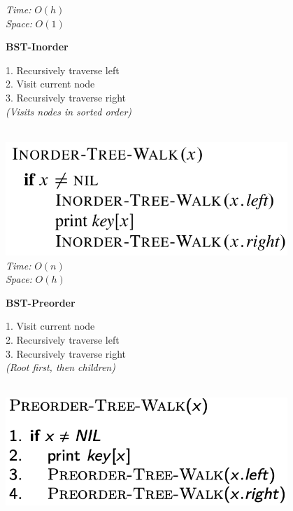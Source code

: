 {\begin{minipage}[t]{1\textwidth}
\begin{minipage}[t]{0.19\textwidth}
        \textit{Time:} \(O(h)\)\\
        \textit{Space:} \(O(1)\)
    \end{minipage}
    \hfill
    \begin{minipage}[t]{0.19\textwidth}
        \centering
        \textbf{\scriptsize BST-Inorder}\\[2pt]
        \scriptsize
        \begin{minipage}[t]{\textwidth}
            \scriptsize
            1. Recursively traverse left\\
            2. Visit current node\\
            3. Recursively traverse right\\
            \textit{(Visits nodes in sorted order)}
        \end{minipage}\\[4pt]
        \includegraphics[width=0.8\textwidth]{images/bst-inorder.png}\\[2pt]
        \textit{Time:} \(O(n)\)\\
        \textit{Space:} \(O(h)\)
    \end{minipage}
    \hfill
    \begin{minipage}[t]{0.19\textwidth}
        \centering
        \textbf{\scriptsize BST-Preorder}\\[2pt]
        \scriptsize
        \begin{minipage}[t]{\textwidth}
            \scriptsize
            1. Visit current node\\
            2. Recursively traverse left\\
            3. Recursively traverse right\\
            \textit{(Root first, then children)}
        \end{minipage}\\[4pt]
        \includegraphics[width=0.8\textwidth]{images/bst-preorder.png}\\

\end{minipage}
\end{minipage}}

